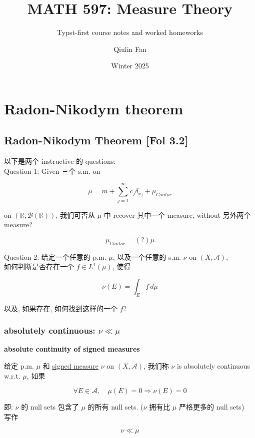 \documentclass{qlnotes-export}
\title{MATH 597: Measure Theory}
\subtitle{Typst-first course notes and worked homeworks}
\author{Qiulin Fan}
\date{Winter 2025}
\begin{document}
\mainmatter
\chapter{Radon-Nikodym theorem}\label{radon-nikodym-theorem}

\section{Radon-Nikodym Theorem {[}Fol 3.2{]}}

以下是两个 instructive 的 questions:\\
Question 1: Given 三个 s.m. on

\[\mu = m + \sum\limits_{j = 1}^{\infty}c_{j}\delta_{x_{j}} + \mu_{Cantor}\]

on \(({\mathbb{R}},\mathcal{B}({\mathbb{R}}))\), 我们可否从 \(\mu\) 中 recover 其中一个 measure, without 另外两个 measure?

\[\mu_{Cantor} = (?)\mu\]

Question 2: 给定一个任意的 p.m. \(\mu\), 以及一个任意的 s.m. \(\nu\) on \((X,\mathcal{A})\),\\
如何判断是否存在一个 \(f \in L^{1}(\mu)\), 使得

\[\nu(E) = \int_{E}f\, d\mu\]

以及, 如果存在, 如何找到这样的一个 \(f\)?

\subsection{\texorpdfstring{absolutely continuous: \(\nu \ll \mu\)}{absolutely continuous: \textbackslash nu \textbackslash ll \textbackslash mu}}\label{absolutely-continuous-nu-ll-mu}

\begin{definition}{\protect{}\label{kn-absolute-continuity-of-signed-measures}{\textbf{absolute
continuity of signed measures}}}

给定 p.m. \(\mu\) 和 \href{https://qiulinfan.github.io/notes/math/measure-theory/\#kn-signed-measure}{signed measure} \(\nu\) on \((X,\mathcal{A})\), 我们称 \(\nu\) is absolutely continuous w.r.t. \(\mu\), 如果

\[\forall E \in \mathcal{A},\quad\mu(E) = 0\Longrightarrow\nu(E) = 0\]

即: \(\nu\) 的 null sets 包含了 \(\mu\) 的所有 null sets. (\(\nu\) 拥有比 \(\mu\) 严格更多的 null sets)\\
写作

\[\nu \ll \mu\]

\end{definition}
\end{document}
